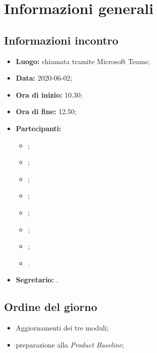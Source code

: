 \section{Informazioni generali}
\subsection{Informazioni incontro}
\begin{itemize}
	\item \textbf{Luogo:} chiamata tramite Microsoft Teams;
	\item \textbf{Data:} 2020-06-02;
	\item \textbf{Ora di inizio:} 10.30;
	\item \textbf{Ora di fine:} 12.50;
	\item \textbf{Partecipanti:}
		\begin{itemize}
			\item \VB;
			\item \LB;
			\item \NF;
			\item \EG;
			\item \FJ;
			\item \MP;
			\item \AS;
			\item \AZ.
		\end{itemize}
	\item \textbf{Segretario:} \LB.
\end{itemize}

\subsection{Ordine del giorno}
\begin{itemize}
	\item Aggiornamenti dei tre moduli;
	\item preparazione alla \textit{Product Baseline};
\end{itemize}
